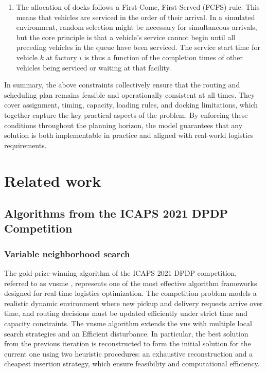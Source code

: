 \documentclass[pdflatex]{sn-jnl}
\begin{document}
\begin{enumerate}
    \item The allocation of docks follows a First-Come, First-Served (FCFS) rule. This means that vehicles are serviced in the order of their arrival. In a simulated environment, random selection might be necessary for simultaneous arrivals, but the core principle is that a vehicle's service cannot begin until all preceding vehicles in the queue have been serviced. The service start time for vehicle $k$ at factory $i$ is thus a function of the completion times of other vehicles being serviced or waiting at that facility.
    
\end{enumerate}

In summary, the above constraints collectively ensure that the routing and scheduling plan remains feasible and operationally consistent at all times. They cover assignment, timing, capacity, loading rules, and docking limitations, which together capture the key practical aspects of the problem. By enforcing these conditions throughout the planning horizon, the model guarantees that any solution is both implementable in practice and aligned with real-world logistics requirements.

\section{Related work}\label{sec:related}
\subsection{Algorithms from the ICAPS 2021 DPDP Competition}
\subsubsection{Variable neighborhood search}
The gold-prize-winning algorithm of the ICAPS 2021 DPDP competition, referred to as \gls{vnsme} \cite{cai2022variable}, represents one of the most effective algorithm frameworks designed for real-time logistics optimization. The competition problem models a realistic dynamic environment where new pickup and delivery requests arrive over time, and routing decisions must be updated efficiently under strict time and capacity constraints. The \gls{vnsme} algorithm extends the \gls{vns} with multiple local search strategies and an Efficient disturbance. In particular, the best solution from the previous iteration is reconstructed to form the initial solution for the current one using two heuristic procedures: an exhaustive reconstruction and a cheapest insertion strategy, which ensure feasibility and computational efficiency.
\end{document}
